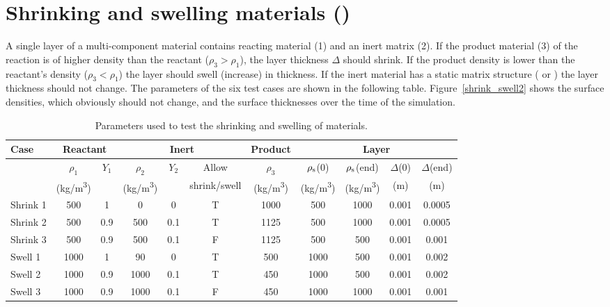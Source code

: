 \documentclass[11pt]{book}
\begin{document}
\section{Shrinking and swelling materials (\texorpdfstring{}{shrink\_swell})}
\label{shrink_swell}

A single layer of a multi-component material contains reacting material (1) and an inert matrix (2). If the product material (3) of the reaction is of higher density than the reactant ($\rho_3 > \rho_1$), the layer thickness $\Delta$ should shrink. If the product density is lower than the reactant's density ($\rho_3 < \rho_1$) the layer should swell (increase) in thickness. If the inert material has a static matrix structure ( or ) the layer thickness should not change. The parameters of the six test cases are shown in the following table. Figure~\ref{shrink_swell2} shows the surface densities, which obviously should not change, and the surface thicknesses over the time of the simulation.

\begin{table}[!htb]
\centering
\caption[Parameters for shrinking and swelling of materials]{Parameters used to test the shrinking and swelling of materials.}
\label{shrink_swell_table}
\begin{tabular}{|l|c|c|c|c|c|c|c|c|c|c|}
\hline
Case     & \multicolumn{2}{|c|}{Reactant}  &  \multicolumn{3}{|c|}{Inert} & Product & \multicolumn{4}{|c|}{Layer} \\ \hline
         & $\rho_1$  & $Y_1$ & $\rho_2$  & $Y_2$ & Allow        & $\rho_3$  & $\rho_{\rm s}$(0) & $\rho_{\rm s}$(end) & $\Delta$(0) & $\Delta$(end) \\
         & (\si{kg/m^3})&       & (\si{kg/m^3})&       & shrink/swell & (\si{kg/m^3})& (\si{kg/m^3})  & (\si{kg/m^3})    & (m)         & (m) \\ \hline

Shrink 1 & 500 & 1   & 0   & 0   & T   & 1000   & 500 & 1000   & 0.001  & 0.0005 \\
Shrink 2 & 500 &0.9  &500  &0.1  &T &1125 &500  &1000 &0.001   &0.0005 \\
Shrink 3 & 500 &0.9  &500  &0.1  &F &1125 &500  &500  &0.001   &0.001 \\
Swell 1          & 1000 &1 &90   &0 &T &500  &1000 &500  &0.001   &0.002 \\
Swell 2          & 1000 &0.9  &1000 &0.1  &T &450  &1000 &500  &0.001   &0.002 \\
Swell 3          & 1000 &0.9  &1000 &0.1  &F &450  &1000 &1000 &0.001   &0.001 \\ \hline
\end{tabular}
\end{table}
\end{document}
